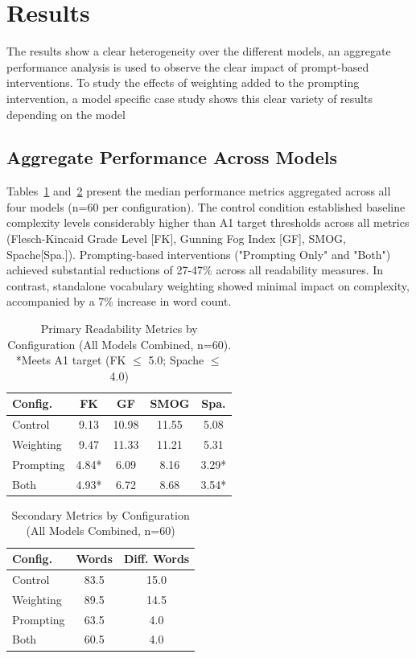 \documentclass[10pt, a4paper]{article}
\begin{document}
\section{Results}
The results show a clear heterogeneity over the different models, an aggregate performance analysis is used to observe the clear impact of prompt-based interventions. To study the effects of weighting added to the prompting intervention, a model specific case study shows this clear variety of results depending on the model

\subsection{Aggregate Performance Across Models}

Tables~\ref{tab:table1a} and~\ref{tab:table1b} present the median performance metrics aggregated across all four models (n=60 per configuration). The control condition established baseline complexity levels considerably higher than A1 target thresholds across all metrics (Flesch-Kincaid Grade Level [FK], Gunning Fog Index [GF], SMOG, Spache[Spa.]). Prompting-based interventions ("Prompting Only" and "Both") achieved substantial reductions of 27-47\% across all readability measures. In contrast, standalone vocabulary weighting showed minimal impact on complexity, accompanied by a 7\% increase in word count.

\begin{table}[!ht]
\begin{center}
\begin{tabular}{lcccc}
\hline
\textbf{Config.} & \textbf{FK} & \textbf{GF} & \textbf{SMOG} & \textbf{Spa.} \\
\hline
Control   & 9.13  & 10.98 & 11.55 & 5.08 \\
Weighting & 9.47  & 11.33 & 11.21 & 5.31 \\
Prompting & 4.84* & 6.09  & 8.16  & 3.29* \\
Both      & 4.93* & 6.72  & 8.68  & 3.54* \\
\hline
\end{tabular}
\caption{Primary Readability Metrics by Configuration (All Models Combined, n=60). *Meets A1 target (FK $\leq$ 5.0; Spache $\leq$ 4.0)}
\label{tab:table1a}
\end{center}
\end{table}

\begin{table}[!ht]
\begin{center}
\begin{tabular}{lcc}
\hline
\textbf{Config.} & \textbf{Words} & \textbf{Diff. Words} \\
\hline
Control   & 83.5 & 15.0 \\
Weighting & 89.5 & 14.5 \\
Prompting & 63.5 & 4.0  \\
Both      & 60.5 & 4.0  \\
\hline
\end{tabular}
\caption{Secondary Metrics by Configuration (All Models Combined, n=60)}
\label{tab:table1b}
\end{center}
\end{table}
\end{document}
